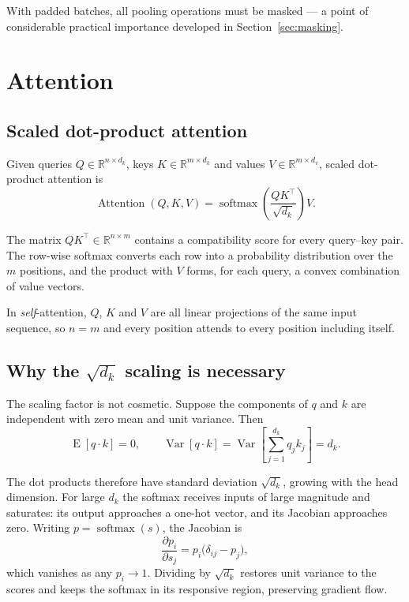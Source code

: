With padded batches, all pooling operations must be masked --- a point of considerable practical
importance developed in Section~\ref{sec:masking}.

\section{Attention}

\subsection{Scaled dot-product attention}

Given queries $Q \in \mathbb{R}^{n \times d_k}$, keys $K \in \mathbb{R}^{m \times d_k}$ and values
$V \in \mathbb{R}^{m \times d_v}$, scaled dot-product attention is
\begin{equation}
\operatorname{Attention}(Q,K,V)
  = \operatorname{softmax}\!\left(\frac{QK^{\top}}{\sqrt{d_k}}\right) V .
\label{eq:attention}
\end{equation}

The matrix $QK^{\top} \in \mathbb{R}^{n\times m}$ contains a compatibility score for every
query--key pair. The row-wise softmax converts each row into a probability distribution over the
$m$ positions, and the product with $V$ forms, for each query, a convex combination of value
vectors.

In \emph{self}-attention, $Q$, $K$ and $V$ are all linear projections of the same input sequence,
so $n = m$ and every position attends to every position including itself.

\subsection{Why the $\sqrt{d_k}$ scaling is necessary}

The scaling factor is not cosmetic. Suppose the components of $q$ and $k$ are independent with zero
mean and unit variance. Then
\begin{equation}
\operatorname{E}\!\left[q \cdot k\right] = 0,
\qquad
\operatorname{Var}\!\left[q \cdot k\right]
  = \operatorname{Var}\!\left[\sum_{j=1}^{d_k} q_j k_j\right] = d_k .
\end{equation}

The dot products therefore have standard deviation $\sqrt{d_k}$, growing with the head dimension.
For large $d_k$ the softmax receives inputs of large magnitude and saturates: its output approaches
a one-hot vector, and its Jacobian approaches zero. Writing $p = \operatorname{softmax}(s)$, the
Jacobian is
\begin{equation}
\frac{\partial p_i}{\partial s_j} = p_i\big(\delta_{ij} - p_j\big),
\end{equation}
which vanishes as any $p_i \to 1$. Dividing by $\sqrt{d_k}$ restores unit variance to the scores
and keeps the softmax in its responsive region, preserving gradient flow.

